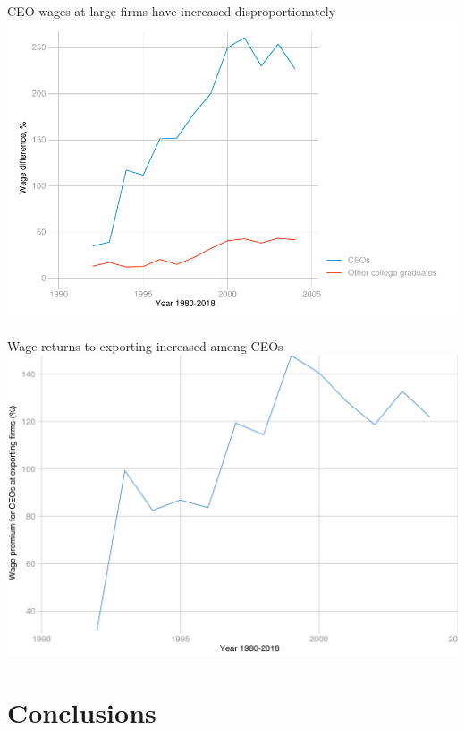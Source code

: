 \documentclass[
  ignorenonframetext,
  aspectratio=43,
]{beamer}
\begin{document}
\begin{frame}{CEO wages at large firms have increased
disproportionately}
\protect\hypertarget{ceo-wages-at-large-firms-have-increased-disproportionately}{}
\includegraphics[width=\textwidth,height=0.7\textheight]{figure/wage_premium.pdf}
\end{frame}

\begin{frame}{Wage returns to exporting increased among CEOs}
\protect\hypertarget{wage-returns-to-exporting-increased-among-ceos}{}
\includegraphics[width=\textwidth,height=0.7\textheight]{figure/exporter_wage_premium.png}
\end{frame}

\hypertarget{conclusions}{%
\section{Conclusions}\label{conclusions}}
\end{document}
